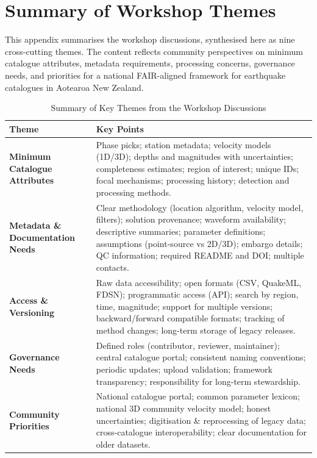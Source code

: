 \documentclass[11pt]{article}
\begin{document}
\section{Summary of Workshop Themes}
\label{app:workshop}
This appendix summarises the workshop discussions, synthesised here as nine cross-cutting themes. The content reflects community perspectives on minimum catalogue attributes, metadata requirements, processing concerns, governance needs, and priorities for a national FAIR-aligned framework for earthquake catalogues in Aotearoa New Zealand.
\begin{table}[H]
\centering
\small
\caption{Summary of Key Themes from the Workshop Discussions}
\setlength{\tabcolsep}{6pt}
\renewcommand{\arraystretch}{1.15}
\begin{tabular}{p{3.2cm} p{11cm}}
\toprule
\textbf{Theme} & \textbf{Key Points} \\
\midrule

\textbf{Minimum Catalogue Attributes} &
Phase picks; station metadata; velocity models (1D/3D); depths and magnitudes with uncertainties; completeness estimates; region of interest; unique IDs; focal mechanisms; processing history; detection and processing methods. \\[0.2cm]

\textbf{Metadata \& Documentation Needs} &
Clear methodology (location algorithm, velocity model, filters); solution provenance; waveform availability; descriptive summaries; parameter definitions; assumptions (point-source vs 2D/3D); embargo details; QC information; required README and DOI; multiple contacts. \\[0.2cm]

\textbf{Access \& Versioning} &
Raw data accessibility; open formats (CSV, QuakeML, FDSN); programmatic access (API); search by region, time, magnitude; support for multiple versions; backward/forward compatible formats; tracking of method changes; long-term storage of legacy releases. \\[0.2cm]

\textbf{Governance Needs} &
Defined roles (contributor, reviewer, maintainer); central catalogue portal; consistent naming conventions; periodic updates; upload validation; framework transparency; responsibility for long-term stewardship. \\[0.2cm]

\textbf{Community Priorities} &
National catalogue portal; common parameter lexicon; national 3D community velocity model; honest uncertainties; digitisation \& reprocessing of legacy data; cross-catalogue interoperability; clear documentation for older datasets. \\[0.2cm]


\end{tabular}
\end{table}
\end{document}
